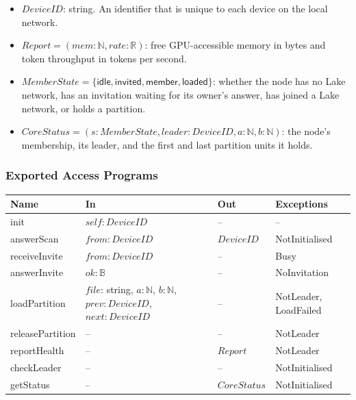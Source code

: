 \documentclass[12pt, titlepage]{article}
\begin{document}
\begin{itemize}
  \item $\mathit{DeviceID}$: string. An identifier that is unique to each device
    on the local network.
  \item $\mathit{Report} = (\mathit{mem}: \mathbb{N}, \mathit{rate}:
    \mathbb{R})$: free GPU-accessible memory in bytes and token throughput in
    tokens per second.
  \item $\mathit{MemberState} = \{\mathsf{idle}, \mathsf{invited},
    \mathsf{member}, \mathsf{loaded}\}$: whether the node has no Lake network,
    has an invitation waiting for its owner's answer, has joined a Lake network,
    or holds a partition.
  \item $\mathit{CoreStatus} = (s: \mathit{MemberState}, \mathit{leader}:
    \mathit{DeviceID}, a: \mathbb{N}, b: \mathbb{N})$: the node's membership,
    its leader, and the first and last partition units it holds.
\end{itemize}

\subsubsection{Exported Access Programs}

\begin{center}
\begin{tabular}{p{3.3cm} p{4.3cm} p{2.0cm} p{3.8cm}}
\toprule
\textbf{Name} & \textbf{In} & \textbf{Out} & \textbf{Exceptions} \\
\midrule
init & $\mathit{self}: \mathit{DeviceID}$ & -- & -- \\
answerScan & $\mathit{from}: \mathit{DeviceID}$ & $\mathit{DeviceID}$ & NotInitialised \\
receiveInvite & $\mathit{from}: \mathit{DeviceID}$ & -- & Busy \\
answerInvite & $\mathit{ok}: \mathbb{B}$ & -- & NoInvitation \\
loadPartition & $\mathit{file}$: string, $a: \mathbb{N}$, $b: \mathbb{N}$,
  $\mathit{prev}: \mathit{DeviceID}$, $\mathit{next}: \mathit{DeviceID}$
  & -- & NotLeader, LoadFailed \\
releasePartition & -- & -- & NotLeader \\
reportHealth & -- & $\mathit{Report}$ & NotLeader \\
checkLeader & -- & -- & NotInitialised \\
getStatus & -- & $\mathit{CoreStatus}$ & NotInitialised \\
\bottomrule
\end{tabular}
\end{center}
\end{document}
